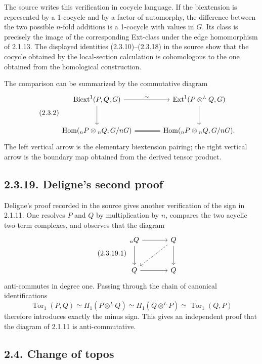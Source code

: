 \documentclass[11pt]{article}
\providecommand{\Tor}{\operatorname{Tor}}
\providecommand{\Hom}{\operatorname{Hom}}
\providecommand{\Ext}{\operatorname{Ext}}
\providecommand{\Biext}{\operatorname{Biext}}
\begin{document}
The source writes this verification in cocycle language.  If the biextension is represented by a 1-cocycle and by a factor of automorphy, the difference between the two possible \(n\)-fold additions is a 1-cocycle with values in \(G\).  Its class is precisely the image of the corresponding Ext-class under the edge homomorphism of 2.1.13.  The displayed identities (2.3.10)--(2.3.18) in the source show that the cocycle obtained by the local-section calculation is cohomologous to the one obtained from the homological construction.

The comparison can be summarized by the commutative diagram
\begin{equation}\tag{2.3.2}
\begin{tikzcd}[column sep=large,row sep=large]
\Biext^1(P,Q;G)\arrow[r,"\sim"]\arrow[d]&\Ext^1(P\otimes^LQ,G)\arrow[d]\\
\Hom({}_nP\otimes{}_nQ,G/nG)\arrow[r,equal]&\Hom({}_nP\otimes{}_nQ,G/nG).
\end{tikzcd}
\end{equation}
The left vertical arrow is the elementary biextension pairing; the right vertical arrow is the boundary map obtained from the derived tensor product.

\subsection*{2.3.19. Deligne's second proof}

Deligne's proof recorded in the source gives another verification of the sign in 2.1.11.  One resolves \(P\) and \(Q\) by multiplication by \(n\), compares the two acyclic two-term complexes, and observes that the diagram
\begin{equation}\tag{2.3.19.1}
\begin{tikzcd}[column sep=large,row sep=large]
{}_nQ\arrow[r]\arrow[d]&Q\arrow[d]\arrow[dl,dashed]\\
Q\arrow[r]&Q
\end{tikzcd}
\end{equation}
anti-commutes in degree one.  Passing through the chain of canonical identifications
\[
        \Tor_1(P,Q)\simeq H_1(P\otimes^LQ)
        \simeq H_1(Q\otimes^LP)
        \simeq \Tor_1(Q,P)
\]
therefore introduces exactly the minus sign.  This gives an independent proof that the diagram of 2.1.11 is anti-commutative.

\subsection*{2.4. Change of topos}
\end{document}
